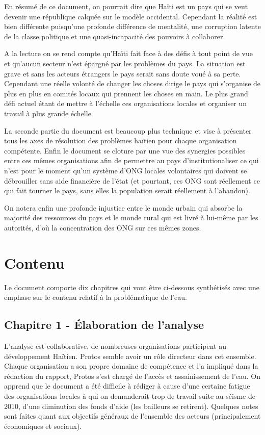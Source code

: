 \documentclass[a4paper, 11pt]{article}
\begin{document}
En résumé de ce document, on pourrait dire que Haïti est un pays qui se veut devenir une république calquée sur le modèle occidental. Cependant la réalité est bien différente puisqu'une profonde différence de mentalité, une corruption latente de la classe politique et une quasi-incapacité des pouvoirs à collaborer.

A la lecture on se rend compte qu'Haïti fait face à des défis à tout point de vue et qu'aucun secteur n'est épargné par les problèmes du pays. La situation est grave et sans les acteurs étrangers le pays serait sans doute voué à sa perte. Cependant une réelle volonté de changer les choses dirige le pays qui s'organise de plus en plus en comités locaux qui prennent les choses en main. Le plus grand défi actuel étant de mettre à l'échelle ces organisations locales et organiser un travail à plus grande échelle.

La seconde partie du document est beaucoup plus technique et vise à présenter tous les axes de résolution des problèmes haïtien pour chaque organisation compétente. Enfin le document se cloture par une vue des synergies possibles entre ces mêmes organisations afin de permettre au pays d'institutionaliser ce qui n'est pour le moment qu'un système d'ONG locales volontaires qui doivent se débrouiller sans aide financière de l'état (et pourtant, ces ONG sont réellement ce qui fait tourner le pays, sans elles la population serait réellement à l'abandon).

On notera enfin une profonde injustice entre le monde urbain qui absorbe la majorité des ressources du pays et le monde rural qui est livré à lui-même par les autorités, d'où la concentration des ONG sur ces mêmes zones.

\section*{Contenu}
Le document comporte dix chapitres qui vont être ci-dessous synthétisés avec une emphase sur le contenu relatif à la problématique de l'eau.
  \subsection*{Chapitre 1 - \'Elaboration de l'analyse}
  L'analyse est collaborative, de nombreuses organisations participent au développement Haïtien. Protos semble avoir un rôle directeur dans cet ensemble. Chaque organisation a son propre domaine de compétence et l'a impliqué dans la rédaction du rapport, Protos s'est chargé de l'accès et assainissement de l'eau. On apprend que le document a été difficile à rédiger à cause d'une certaine fatigue des organisations locales à qui on demanderait trop de travail suite au séisme de 2010, d'une diminution des fonds d'aide (les bailleurs se retirent). Quelques notes sont faites quant aux objectifs généraux de l'ensemble des acteurs (principalement économiques et sociaux).
\end{document}
